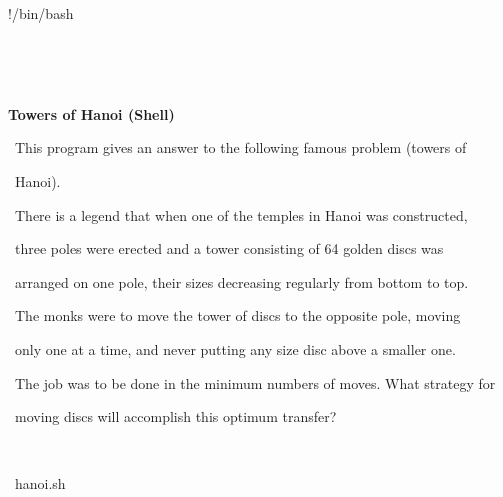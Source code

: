 \documentclass[a4paper,10pt]{article}
\def\mc{\relax}
\begin{document}
\tt\mc 

\noindent
\mbox{}\rm\mc {\tt\#}!/bin/bash
\tt\mc 

\noindent
\mbox{}\rm\mc {\tt\#} \hrulefill 
\tt\mc 

\noindent
\mbox{}\rm\mc {\tt\#} \ %
\tt\mc 

\noindent
\mbox{}\rm\mc {\tt\#} \ \centerline{\bf Towers of Hanoi (Shell)} 
\tt\mc 

\noindent
\mbox{}\rm\mc {\tt\#}  
\tt\mc 

\noindent
\mbox{}\rm\mc {\tt\#} \ \hspace{\leftmargini}This program gives an answer to the following famous problem (towers of 
\tt\mc 

\noindent
\mbox{}\rm\mc {\tt\#} \ \hspace{\leftmargini}Hanoi). 
\tt\mc 

\noindent
\mbox{}\rm\mc {\tt\#} \ \hspace{\leftmargini}There is a legend that when one of the temples in Hanoi was constructed, 
\tt\mc 

\noindent
\mbox{}\rm\mc {\tt\#} \ \hspace{\leftmargini}three poles were erected and a tower consisting of 64 golden discs was 
\tt\mc 

\noindent
\mbox{}\rm\mc {\tt\#} \ \hspace{\leftmargini}arranged on one pole, their sizes decreasing regularly from bottom to top. 
\tt\mc 

\noindent
\mbox{}\rm\mc {\tt\#} \ \hspace{\leftmargini}The monks were to move the tower of discs to the opposite pole, moving 
\tt\mc 

\noindent
\mbox{}\rm\mc {\tt\#} \ \hspace{\leftmargini}only one at a time, and never putting any size disc above a smaller one. 
\tt\mc 

\noindent
\mbox{}\rm\mc {\tt\#} \ \hspace{\leftmargini}The job was to be done in the minimum numbers of moves. What strategy for 
\tt\mc 

\noindent
\mbox{}\rm\mc {\tt\#} \ \hspace{\leftmargini}moving discs will accomplish this optimum transfer? 
\tt\mc 

\noindent
\mbox{}\rm\mc {\tt\#}  \ %
\tt\mc 

\noindent
\mbox{}\rm\mc {\tt\#} \hrulefill\ hanoi.sh \ \hrulefill
\tt\mc 
\end{document}
